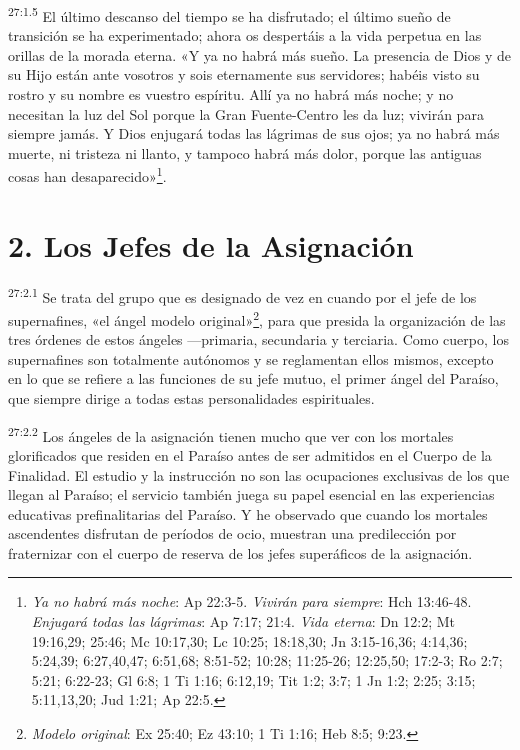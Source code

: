 \par
\textsuperscript{27:1.5} El último descanso del tiempo se ha disfrutado; el último sueño de transición se ha experimentado; ahora os despertáis a la vida perpetua en las orillas de la morada eterna. «Y ya no habrá más sueño. La presencia de Dios y de su Hijo están ante vosotros y sois eternamente sus servidores; habéis visto su rostro y su nombre es vuestro espíritu. Allí ya no habrá más noche; y no necesitan la luz del Sol porque la Gran Fuente-Centro les da luz; vivirán para siempre jamás. Y Dios enjugará todas las lágrimas de sus ojos; ya no habrá más muerte, ni tristeza ni llanto, y tampoco habrá más dolor, porque las antiguas cosas han desaparecido»\footnote{\textit{Ya no habrá más noche}: Ap 22:3-5. \textit{Vivirán para siempre}: Hch 13:46-48. \textit{Enjugará todas las lágrimas}: Ap 7:17; 21:4. \textit{Vida eterna}: Dn 12:2; Mt 19:16,29; 25:46; Mc 10:17,30; Lc 10:25; 18:18,30; Jn 3:15-16,36; 4:14,36; 5:24,39; 6:27,40,47; 6:51,68; 8:51-52; 10:28; 11:25-26; 12:25,50; 17:2-3; Ro 2:7; 5:21; 6:22-23; Gl 6:8; 1 Ti 1:16; 6:12,19; Tit 1:2; 3:7; 1 Jn 1:2; 2:25; 3:15; 5:11,13,20; Jud 1:21; Ap 22:5.}.

\section*{2. Los Jefes de la Asignación}
\par
\textsuperscript{27:2.1} Se trata del grupo que es designado de vez en cuando por el jefe de los supernafines, «el ángel modelo original»\footnote{\textit{Modelo original}: Ex 25:40; Ez 43:10; 1 Ti 1:16; Heb 8:5; 9:23.}, para que presida la organización de las tres órdenes de estos ángeles ---primaria, secundaria y terciaria. Como cuerpo, los supernafines son totalmente autónomos y se reglamentan ellos mismos, excepto en lo que se refiere a las funciones de su jefe mutuo, el primer ángel del Paraíso, que siempre dirige a todas estas personalidades espirituales.

\par
\textsuperscript{27:2.2} Los ángeles de la asignación tienen mucho que ver con los mortales glorificados que residen en el Paraíso antes de ser admitidos en el Cuerpo de la Finalidad. El estudio y la instrucción no son las ocupaciones exclusivas de los que llegan al Paraíso; el servicio también juega su papel esencial en las experiencias educativas prefinalitarias del Paraíso. Y he observado que cuando los mortales ascendentes disfrutan de períodos de ocio, muestran una predilección por fraternizar con el cuerpo de reserva de los jefes superáficos de la asignación.

